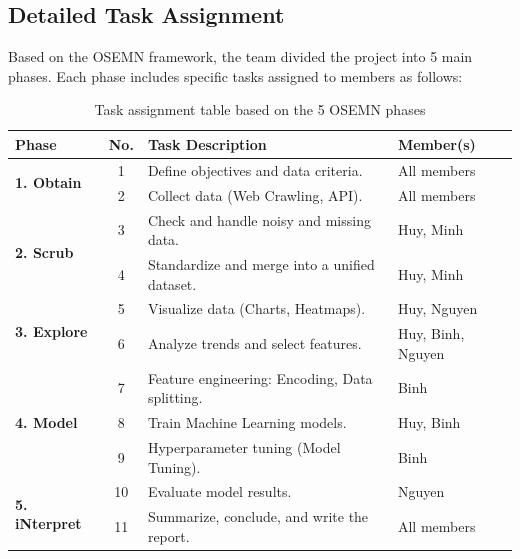 \documentclass[12pt, a4paper]{article}
\begin{document}
\subsection{Detailed Task Assignment}
Based on the OSEMN framework, the team divided the project into 5 main phases. Each phase includes specific tasks assigned to members as follows:

\begin{table}[H]
\centering
\small
\renewcommand{\arraystretch}{1.3}

\begin{tabularx}{\textwidth}{|p{2.5cm}|c|X|p{3.0cm}|}
\hline
\textbf{Phase} & \textbf{No.} & \textbf{Task Description} & \textbf{Member(s)} \\ \hline

\multirow{2}{2.5cm}{\textbf{1. Obtain}} 
 & 1 & Define objectives and data criteria. & All members \\ \cline{2-4}
 & 2 & Collect data (Web Crawling, API). & All members \\ \hline

\multirow{2}{2.5cm}{\textbf{2. Scrub}} 
 & 3 & Check and handle noisy and missing data. & Huy, Minh \\ \cline{2-4}
 & 4 & Standardize and merge into a unified dataset. & Huy, Minh \\ \hline

\multirow{2}{2.5cm}{\textbf{3. Explore}} 
 & 5 & Visualize data (Charts, Heatmaps). & Huy, Nguyen \\ \cline{2-4}
 & 6 & Analyze trends and select features. & Huy, Binh, Nguyen \\ \hline

\multirow{3}{2.5cm}{\textbf{4. Model}} 
 & 7 & Feature engineering: Encoding, Data splitting. & Binh \\ \cline{2-4}
 & 8 & Train Machine Learning models. & Huy, Binh \\ \cline{2-4}
 & 9 & Hyperparameter tuning (Model Tuning). & Binh \\ \hline

\multirow{2}{2.5cm}{\textbf{5. iNterpret}} 
 & 10 & Evaluate model results. & Nguyen \\ \cline{2-4}
 & 11 & Summarize, conclude, and write the report. & All members \\ \hline

\end{tabularx}
\caption{Task assignment table based on the 5 OSEMN phases}
\label{tab:osemn_assignment_final}
\end{table}
\end{document}
